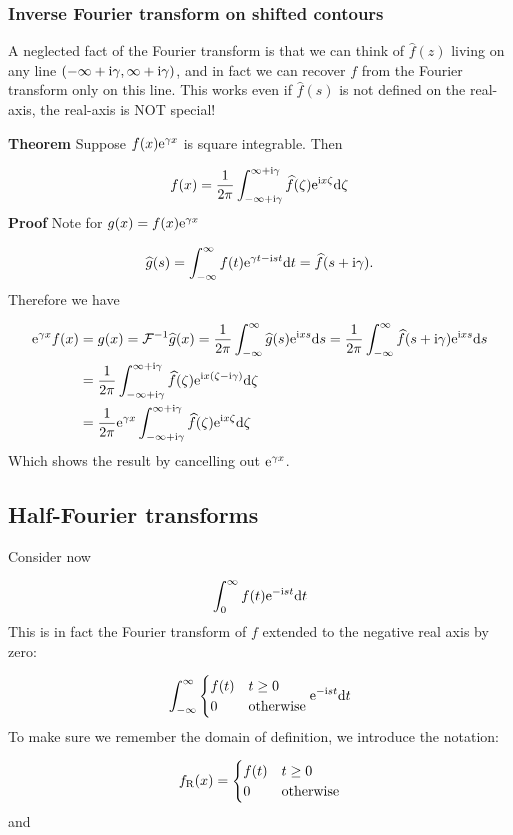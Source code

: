 \documentclass[12pt,landscape]{article}
\def\D{ {\rm d} }
\def\I{ {\rm i} }
\def\E{ {\rm e} }
\def\FF{ {\cal F} }
\def\dt{\D t}
\begin{document}
{\subsubsection{Inverse Fourier transform on shifted contours}
A neglected fact of the Fourier transform is that we can think of $\hat f(z)$ living on any line $(-\infty + \I \gamma, \infty+\I \gamma)$, and in fact we can recover $f$ from the Fourier transform only on this line. This works even if $\hat f(s)$ is not defined on the real-axis, the real-axis is NOT special!

\textbf{Theorem} Suppose $f(x) \E^{\gamma x}$ is square integrable. Then

\[
f(x) = {1 \over 2 \pi} \int_{-\infty+\I \gamma}^{\infty + \I \gamma} \widehat f(\zeta) \E^{\I x \zeta} \D \zeta
\]
\textbf{Proof}  Note for $g(x) = f(x) \E^{\gamma x}$

\[
\widehat g(s) = \int_{-\infty}^\infty f(t) \E^{\gamma t - \I s t} \dt = \widehat f(s + \I \gamma).
\]
Therefore we have


\begin{align*}
\E^{\gamma x} f(x) &= g(x) = \FF^{-1} \widehat g(x) = {1 \over 2 \pi} \int_{-\infty}^{\infty} \widehat g(s) \E^{\I x s} \D s  ={1 \over 2 \pi} \int_{-\infty}^{\infty} \widehat f(s + \I \gamma) \E^{\I x s} \D s \\
   & = {1 \over 2 \pi} \int_{-\infty+ \I \gamma}^{\infty+ \I \gamma} \widehat f(\zeta) \E^{\I x (\zeta - \I \gamma)} \D \zeta \\
    &= {1 \over 2 \pi}
   \E^{\gamma x}  \int_{-\infty+ \I \gamma}^{\infty+ \I \gamma} \widehat f(\zeta) \E^{\I x \zeta} \D \zeta
\end{align*}
Which shows the result by cancelling out $\E^{\gamma x}$.

\subsection{Half-Fourier transforms}
Consider now

\[
\int_0^\infty f(t) \E^{-\I s t} \dt
\]
This is in fact the Fourier transform of $f$ extended to the negative real axis by zero:

\[
\int_{-\infty}^\infty \begin{cases}f(t) & t \geq 0 \\ 0 & \hbox{otherwise} \end{cases} \E^{-\I s t} \dt
\]
To make sure we remember the domain of definition, we introduce the notation:

\[
f_{\rm R}(x) = \begin{cases}f(t) & t \geq 0 \\ 0 & \hbox{otherwise} \end{cases}
\]
and

}
\end{document}
